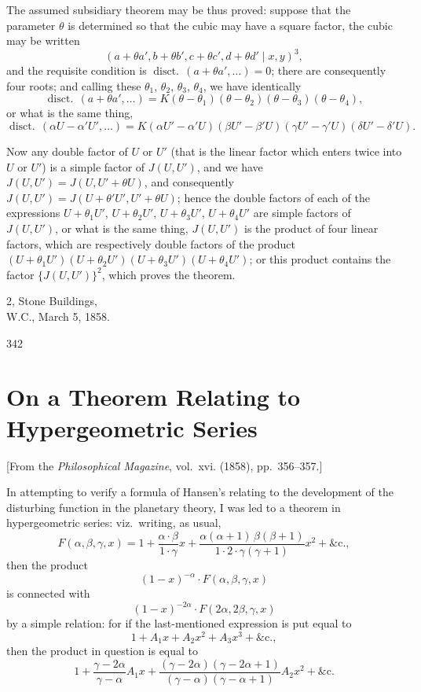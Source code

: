 \documentclass[11pt,a4paper]{book}
\begin{document}
The assumed subsidiary theorem may be thus proved: suppose that the parameter $\theta$ is determined so that the cubic may have a square factor, the cubic may be written
\[
(a + \theta a', b + \theta b', c + \theta c', d + \theta d' \mid x, y)^3,
\]
and the requisite condition is $\operatorname{disct.}\,(a + \theta a', \ldots) = 0$; there are consequently four roots; and calling these $\theta_1$, $\theta_2$, $\theta_3$, $\theta_4$, we have identically
\[
\operatorname{disct.}\,(a + \theta a', \ldots) = K(\theta - \theta_1)(\theta - \theta_2)(\theta - \theta_3)(\theta - \theta_4),
\]
or what is the same thing,
\[
\operatorname{disct.}\,(\alpha U - \alpha' U', \ldots) = K(\alpha U' - \alpha' U)(\beta U' - \beta' U)(\gamma U' - \gamma' U)(\delta U' - \delta' U).
\]

Now any double factor of $U$ or $U'$ (that is the linear factor which enters twice into $U$ or $U'$) is a simple factor of $J(U, U')$, and we have $J(U, U') = J(U, U' + \theta U)$, and consequently $J(U, U') = J(U + \theta' U', U' + \theta U)$; hence the double factors of each of the expressions $U + \theta_1 U'$, $U + \theta_2 U'$, $U + \theta_3 U'$, $U + \theta_4 U'$ are simple factors of $J(U, U')$, or what is the same thing, $J(U, U')$ is the product of four linear factors, which are respectively double factors of the product $(U + \theta_1 U')(U + \theta_2 U')(U + \theta_3 U')(U + \theta_4 U')$; or this product contains the factor $\{J(U, U')\}^2$, which proves the theorem.

\begin{flushright}
2, Stone Buildings,\\
W.C., March 5, 1858.
\end{flushright}
\hfill 342
\newpage


\section{On a Theorem Relating to Hypergeometric Series}
\label{sec:211}

[From the \textit{Philosophical Magazine}, vol.~xvi. (1858), pp.~356--357.]
\vspace{1em}

In attempting to verify a formula of Hansen's relating to the development of the disturbing function in the planetary theory, I was led to a theorem in hypergeometric series: viz.\ writing, as usual,
\[
F(\alpha, \beta, \gamma, x) = 1 + \frac{\alpha \cdot \beta}{1 \cdot \gamma}x + \frac{\alpha(\alpha+1)\,\beta(\beta+1)}{1 \cdot 2 \cdot \gamma(\gamma+1)}x^2 + \&\text{c.},
\]
then the product
\[
(1-x)^{-\alpha} \cdot F(\alpha, \beta, \gamma, x)
\]
is connected with
\[
(1-x)^{-2\alpha} \cdot F(2\alpha, 2\beta, \gamma, x)
\]
by a simple relation: for if the last-mentioned expression is put equal to
\[
1 + A_1 x + A_2 x^2 + A_3 x^3 + \&\text{c.},
\]
then the product in question is equal to
\[
1 + \frac{\gamma - 2\alpha}{\gamma - \alpha}A_1 x + \frac{(\gamma - 2\alpha)(\gamma - 2\alpha + 1)}{(\gamma - \alpha)(\gamma - \alpha + 1)}A_2 x^2 + \&\text{c.}
\]
\end{document}
